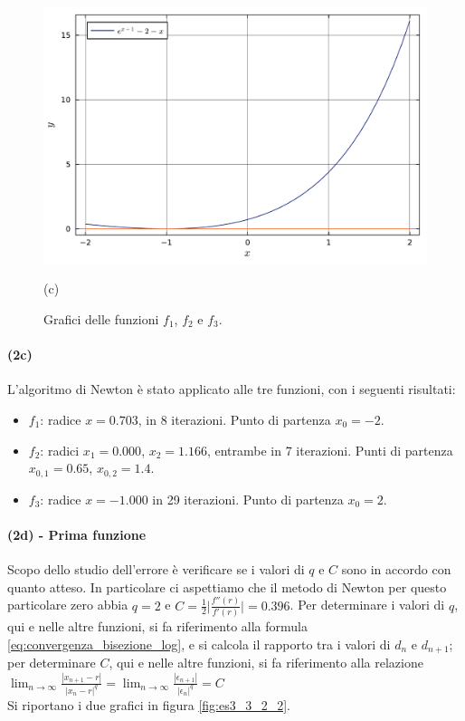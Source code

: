 \documentclass[letterpaper, 12pt]{article}
\begin{document}
\begin{figure}[!ht]
    \vspace{0.5cm}

    \begin{minipage}[b]{0.47\textwidth}
        \includegraphics[width=\textwidth]{3323.pdf}
        \caption*{(c)}
    \end{minipage}
    \caption{Grafici delle funzioni $f_1$, $f_2$ e $f_3$.}
    \label{fig:es3_3_2_1}
\end{figure}

\paragraph{(2c) } L'algoritmo di Newton è stato applicato alle tre funzioni, con i seguenti risultati:
\begin{itemize}
    \item $f_1$: radice $x = 0.703$, in 8 iterazioni. Punto di partenza $x_0 = -2$.
    \item $f_2$: radici $x_1 = 0.000$, $x_2 = 1.166$, entrambe in 7 iterazioni. Punti di partenza $x_{0,1} = 0.65$, $x_{0,2} = 1.4$.
    \item $f_3$: radice $x = -1.000$ in 29 iterazioni. Punto di partenza $x_0 = 2$.
\end{itemize}

\paragraph{(2d) - Prima funzione}
Scopo dello studio dell'errore è verificare se i valori di $q$ e $C$ sono in accordo con quanto atteso.
In particolare ci aspettiamo che il metodo di Newton per questo particolare zero abbia $q = 2$ e 
$C = {\frac{1}{2}}\bigg|{\frac{f''(r)}{f'(r)}}\bigg| = 0.396$. Per determinare i valori di $q$, qui e nelle altre funzioni,
si fa riferimento alla formula \ref{eq:convergenza_bisezione_log}, e si calcola il rapporto tra i valori di 
$d_n$ e $d_{n+1}$; per determinare $C$, qui e nelle altre funzioni, si fa riferimento alla relazione 
$\lim_{n\to\infty} {\frac{|x_{n+1}-r|}{|x_n-r|^q}}= \lim_{n\to\infty} {\frac{|\epsilon_{n+1}|}{|\epsilon_n|^q}}=C$ \\
Si riportano i due grafici in figura \ref{fig:es3_3_2_2}.
\end{document}
